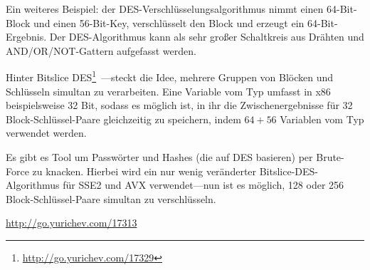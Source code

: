 Ein weiteres Beispiel: der DES-Verschlüsselungsalgorithmus nimmt einen 64-Bit-Block und einen 56-Bit-Key, verschlüsselt
den Block und erzeugt ein 64-Bit-Ergebnis. 
Der DES-Algorithmus kann als sehr großer Schaltkreis aus Drähten und AND/OR/NOT-Gattern aufgefasst werden.

\label{bitslicedes}
\newcommand{\URLBS}{\url{http://go.yurichev.com/17329}}
Hinter Bitslice DES\footnote{\URLBS}~---steckt die Idee, mehrere Gruppen von Blöcken und Schlüsseln simultan zu
verarbeiten. Eine Variable vom Typ  umfasst in x86 beispielsweise 32 Bit, sodass es möglich ist, in ihr
die Zwischenergebnisse für 32 Block-Schlüssel-Paare gleichzeitig zu speichern, indem $64+56$ Variablen vom Typ
 verwendet werden.

\myindex{\oracle}
Es gibt es Tool um \oracle Passwörter und Hashes (die auf DES basieren) per Brute-Force zu knacken. Hierbei wird ein nur
wenig veränderter Bitslice-DES-Algorithmus für SSE2 und AVX verwendet---nun ist es möglich, 128 oder 256
Block-Schlüssel-Paare simultan zu verschlüsseln.

\url{http://go.yurichev.com/17313}




